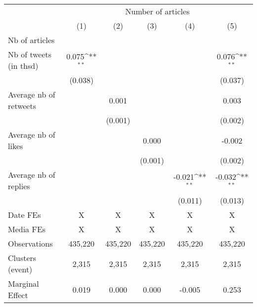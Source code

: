 {
\def\sym#1{\ifmmode^{#1}\else\(^{#1}\)\fi}
\begin{tabular}{l*{5}{c}}
\hline\hline
                    &\multicolumn{5}{c}{Number of articles}                                                                       \\\cmidrule(lr){2-6}
                    &\multicolumn{1}{c}{(1)}         &\multicolumn{1}{c}{(2)}         &\multicolumn{1}{c}{(3)}         &\multicolumn{1}{c}{(4)}         &\multicolumn{1}{c}{(5)}         \\
\hline
Nb of articles      &                     &                     &                     &                     &                     \\
Nb of tweets (in thsd)&       0.075\sym{**} &                     &                     &                     &       0.076\sym{**} \\
                    &     (0.038)         &                     &                     &                     &     (0.037)         \\
Average nb of retweets&                     &       0.001         &                     &                     &       0.003         \\
                    &                     &     (0.001)         &                     &                     &     (0.002)         \\
Average nb of likes &                     &                     &       0.000         &                     &      -0.002         \\
                    &                     &                     &     (0.001)         &                     &     (0.002)         \\
Average nb of replies&                     &                     &                     &      -0.021\sym{**} &      -0.032\sym{**} \\
                    &                     &                     &                     &     (0.011)         &     (0.013)         \\
\hline
Date FEs            &           X         &           X         &           X         &           X         &           X         \\
Media FEs           &           X         &           X         &           X         &           X         &           X         \\
Observations        &     435,220         &     435,220         &     435,220         &     435,220         &     435,220         \\
Clusters (event)    &       2,315         &       2,315         &       2,315         &       2,315         &       2,315         \\
Marginal Effect     &       0.019         &       0.000         &       0.000         &      -0.005         &       0.253         \\
\hline\hline
\end{tabular}
}
